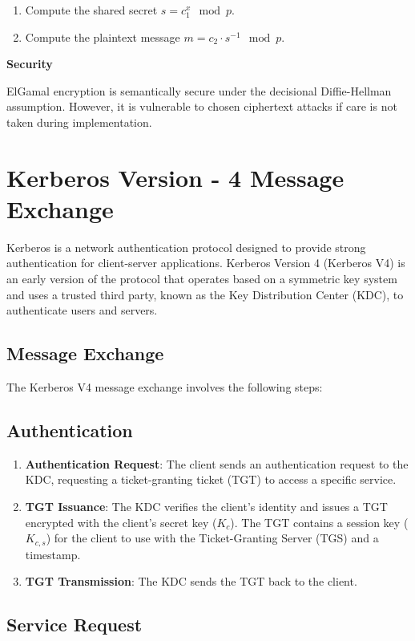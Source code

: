 \documentclass[11pt]{article}
\begin{document}
\begin{enumerate}
    \item Compute the shared secret $s = c_1^x \mod p$.
    \item Compute the plaintext message $m = c_2 \cdot s^{-1} \mod p$.
\end{enumerate}

\textbf{Security}

ElGamal encryption is semantically secure under the decisional Diffie-Hellman assumption. However, it is vulnerable to chosen ciphertext attacks if care is not taken during implementation.

\section{Kerberos Version - 4 Message Exchange}
Kerberos is a network authentication protocol designed to provide strong authentication for client-server applications. Kerberos Version 4 (Kerberos V4) is an early version of the protocol that operates based on a symmetric key system and uses a trusted third party, known as the Key Distribution Center (KDC), to authenticate users and servers.

\subsection{Message Exchange}

The Kerberos V4 message exchange involves the following steps:

\subsection{Authentication}

\begin{enumerate}
    \item \textbf{Authentication Request}: The client sends an authentication request to the KDC, requesting a ticket-granting ticket (TGT) to access a specific service.
    \item \textbf{TGT Issuance}: The KDC verifies the client's identity and issues a TGT encrypted with the client's secret key ($K_c$). The TGT contains a session key ($K_{c,s}$) for the client to use with the Ticket-Granting Server (TGS) and a timestamp.
    \item \textbf{TGT Transmission}: The KDC sends the TGT back to the client.
\end{enumerate}

\subsection{Service Request}
\end{document}
